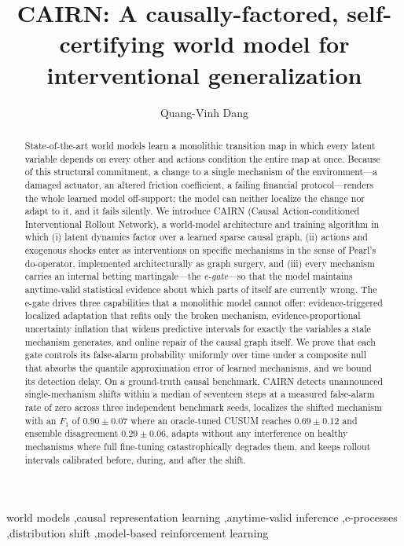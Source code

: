 \documentclass[preprint,12pt]{elsarticle}
\newif\ifanon
\theoremstyle{definition}
\theoremstyle{remark}
\begin{document}
\begin{frontmatter}

\title{CAIRN: A causally-factored, self-certifying world model for interventional generalization}

\ifanon
\author{Anonymous Author}
\affiliation{organization={Anonymous Institution}}
\else
\author[buv]{Quang-Vinh Dang}
\fi

\begin{abstract}
State-of-the-art world models learn a monolithic transition map
in which every latent variable depends on every other and actions
condition the entire map at once. Because of this structural commitment,
a change to a single mechanism of the environment---a damaged actuator, an
altered friction coefficient, a failing financial protocol---renders the
whole learned model off-support: the model can neither localize the change
nor adapt to it, and it fails silently. We introduce CAIRN (Causal
Action-conditioned Interventional Rollout Network), a world-model
architecture and training algorithm in which (i) latent dynamics factor
over a learned sparse causal graph, (ii) actions and exogenous shocks
enter as interventions on specific mechanisms in the sense of Pearl's
do-operator, implemented architecturally as graph surgery, and (iii) every
mechanism carries an internal betting martingale---the \emph{e-gate}---so
that the model maintains anytime-valid statistical evidence about which
parts of itself are currently wrong. The e-gate drives three capabilities
that a monolithic model cannot offer: evidence-triggered localized
adaptation that refits only the broken mechanism, evidence-proportional
uncertainty inflation that widens predictive intervals for exactly the
variables a stale mechanism generates, and online repair of the causal
graph itself. We prove that each gate controls its false-alarm probability
uniformly over time under a composite null that absorbs the quantile
approximation error of learned mechanisms, and we bound its detection
delay. On a ground-truth causal benchmark, CAIRN detects unannounced
single-mechanism shifts within a median of seventeen steps at a measured
false-alarm rate of zero across three independent benchmark seeds,
localizes the shifted mechanism with an $F_1$ of $0.90\pm0.07$ where an
oracle-tuned CUSUM reaches $0.69\pm0.12$ and ensemble disagreement
$0.29\pm0.06$, adapts without any interference on healthy
mechanisms where full fine-tuning catastrophically degrades them, and
keeps rollout intervals calibrated before, during, and after the shift.
\end{abstract}

\begin{keyword}
world models \sep causal representation learning \sep anytime-valid
inference \sep e-processes \sep distribution shift \sep model-based
reinforcement learning
\end{keyword}

\end{frontmatter}
\end{document}
